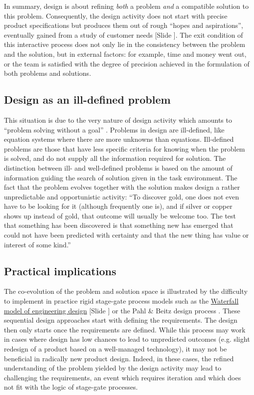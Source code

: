 \documentclass{article}
\newcounter{slide}
\begin{document}
In summary, design is about refining \emph{both} a problem \emph{and} a compatible solution to this problem. Consequently, the design activity does not start with precise product specifications but produces them out of rough ``hopes and aspirations'', eventually gained from a study of customer needs \cite[p. 73]{ulrichProductDesignDevelopment2011} {\color{blue}[Slide ]}. The exit condition of this interactive process does not only lie in the consistency between the problem and the solution, but in external factors: for example, time and money went out, or the team is satisfied with the degree of precision achieved in the formulation of both problems and solutions. 

\subsection{Design as an ill-defined problem}
\label{sec:DesignAsAnIllDefinedProblem}
This situation is due to the very nature of design activity which amounts to ``problem solving without a goal'' \cite[p. 106]{simon1996sciences}. Problems in design are ill-defined, like equation systems where there are more unknowns than equations. Ill-defined problems are those that have less specific criteria for knowing when the problem is solved, and do not supply all the information required for solution. The distinction between ill- and well-defined problems is based on the amount of information guiding the search of solution given in the task environment. The fact that the problem evolves together with the solution makes design a rather unpredictable and opportunistic activity: ``To discover gold, one does not even have to be looking for it (although frequently one is), and if silver or copper shows up instead of gold, that outcome will usually be welcome too. The test that something has been discovered is that something new has emerged that could not have been predicted with certainty and that the new thing has value or interest of some kind.''

\subsection{Practical implications}
\label{sec:practicalimplications}

The co-evolution of the problem and solution space is illustrated by the difficulty to implement in practice rigid stage-gate process models such as the \href{https://en.wikipedia.org/wiki/Waterfall\_model}{Waterfall model of engineering design} {\color{blue}[Slide ]} or the Pahl \& Beitz design process \cite{pahlEngineeringDesignSystematic2007}. These sequential design approaches start with defining the requirements. The design then only starts once the requirements are defined. While this process may work in cases where design has low chances to lead to unpredicted outcomes (e.g. slight redesign of a product based on a well-managed technology), it may not be beneficial in radically new product design. Indeed, in these cases, the refined understanding of the problem yielded by the design activity may lead to challenging the requirements, an event which requires iteration and which does not fit with the logic of stage-gate processes.
\end{document}
